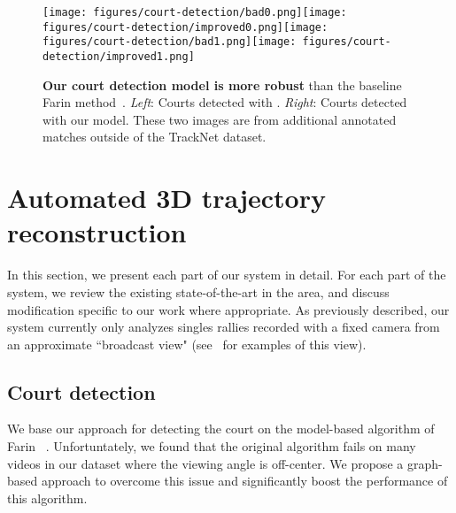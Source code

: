 \begin{figure}[ht]
    \centering
    \texttt{[image: figures/court-detection/bad0.png]}\linebreak[0]
    \texttt{[image: figures/court-detection/improved0.png]}\linebreak[0]
    \texttt{[image: figures/court-detection/bad1.png]}\linebreak[0]
    \texttt{[image: figures/court-detection/improved1.png]}\linebreak[0]
    \caption{{\bf Our court detection model is more robust} than the baseline Farin \etal method~\cite{FKWE04}. \emph{Left}: Courts detected with \cite{FKWE04}. \emph{Right}: Courts detected with our model. These two images are from additional annotated matches outside of the TrackNet dataset.
    \label{fig:court-improvements}}
\end{figure}

\section{Automated 3D trajectory reconstruction}
\label{sec:annotation_pipeline}
In this section, we present each part of our system in detail. For each part of the system, we review the existing state-of-the-art in the area, and discuss modification specific to our work where appropriate. As previously described, our system currently only analyzes singles rallies recorded with a fixed camera from an approximate ``broadcast view" (see~ for examples of this view).

\subsection{Court detection}
\label{sec:court-detection}

We base our approach for detecting the court on the model-based algorithm of Farin \etal~\cite{FKWE04,chen_physics-based_2009,LLHG06,CTLY12}. Unfortuntately, we found that the original algorithm fails on many videos in our dataset where the viewing angle is off-center. We propose a graph-based approach to overcome this issue and significantly boost the performance of this algorithm.

